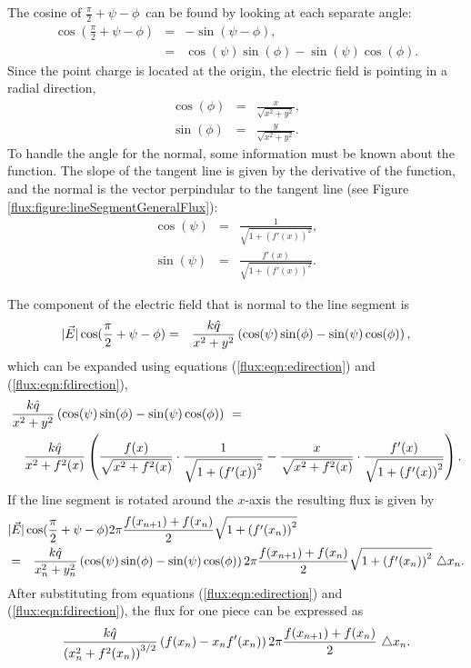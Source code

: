 The cosine of $\frac{\pi}{2}+\psi-\phi$\ can be found by looking at
each separate angle:
\begin{eqnarray*}
  \cos(\frac{\pi}{2} + \psi-\phi) & = & -\sin(\psi-\phi), \\
  & = & \cos(\psi)\sin(\phi) - \sin(\psi)\cos(\phi).
\end{eqnarray*}
Since the point charge is located at the origin, the electric field is
pointing in a radial direction,
\begin{eqnarray}
  \label{flux:eqn:edirection}
  \cos(\phi) & = & \frac{x}{\sqrt{x^2+y^2}}, \\
  \sin(\phi) & = & \frac{y}{\sqrt{x^2+y^2}}. \nonumber
\end{eqnarray}
To handle the angle for the normal, some information must be known
about the function. The slope of the tangent line is given by the
derivative of the function, and the normal is the vector perpindular
to the tangent line (see Figure
\ref{flux:figure:lineSegmentGeneralFlux}):
\begin{eqnarray}
  \label{flux:eqn:fdirection}
  \cos(\psi) & = & \frac{1}{\sqrt{1+(f'(x))^2}}, \\
  \sin(\psi) & = & \frac{f'(x)}{\sqrt{1+(f'(x))^2}}. \nonumber
\end{eqnarray}

The component of the electric field that is normal to the line segment
is
\begin{eqnarray*}
  |\vec{E}| \cos(\frac{\pi}{2} + \psi-\phi) & = &
       \frac{k\hat{q}}{x^2+y^2}
  \left( \cos(\psi)\sin(\phi) - \sin(\psi)\cos(\phi) \right),  \\
\end{eqnarray*}
which can be expanded using equations (\ref{flux:eqn:edirection}) and
(\ref{flux:eqn:fdirection}),
\begin{eqnarray*}
  \lefteqn{ \frac{k\hat{q}}{x^2+y^2}
       \lp \cos(\psi)\sin(\phi) - \sin(\psi)\cos(\phi) \rp  ~ = } &&  \\
     & &   \frac{k\hat{q}}{x^2+f^2(x)}
     \lp \frac{f(x)}{\sqrt{x^2+f^2(x)}} \cdot
     \frac{1}{\sqrt{1+\lp f'(x) \rp^2}} -
     \frac{x}{\sqrt{x^2+f^2(x)}} \cdot
     \frac{f'(x)}{\sqrt{1+\lp f'(x) \rp^2}} \rp.
\end{eqnarray*}
If the line segment is rotated around the $x$-axis the resulting flux
is given by
\begin{eqnarray*}
  \lefteqn{|\vec{E}| \cos(\frac{\pi}{2}+\psi-\phi)
    2\pi \frac{f(x_{n+1})+f(x_n)}{2}
    \sqrt{1+ \lp f'(x_n) \rp^2}  } \\
  & = & \frac{k\hat{q}}{x_n^2+y_n^2}
  \lp \cos(\psi)\sin(\phi) - \sin(\psi)\cos(\phi) \rp
     2\pi \frac{f(x_{n+1})+f(x_n)}{2} \sqrt{1+ \lp f'(x_n) \rp^2} ~
     \triangle x_n.  \\
\end{eqnarray*}
After substituting from equations (\ref{flux:eqn:edirection}) and
(\ref{flux:eqn:fdirection}), the flux for one piece can be expressed
as
\begin{eqnarray*}
  \frac{k\hat{q}}{\left( x_n^2+f^2(x_n)\right)^{3/2} }
  \left( f(x_n) - x_n f'(x_n) \right) 2 \pi \frac{f(x_{n+1})+f(x_n)}{2} ~
  \triangle x_n.
\end{eqnarray*}

